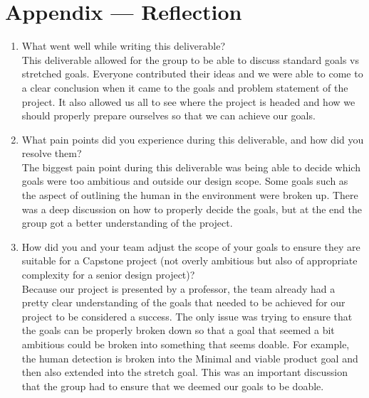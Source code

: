 \documentclass{article}
\begin{document}
\section*{Appendix --- Reflection}
    \begin{enumerate}
        \item What went well while writing this deliverable? \\

This deliverable allowed for the group to be able to discuss standard goals vs stretched goals. Everyone contributed their ideas and we were able to come to a clear conclusion 
when it came to the goals and problem statement of the project. It also allowed us all to see where the project is headed and how we should properly prepare
 ourselves so that we can achieve our goals. 

\item What pain points did you experience during this deliverable, and how
did you resolve them?\\

The biggest pain point during this deliverable was being able to decide which goals were too ambitious and outside our design scope. Some goals such as the aspect of outlining the human 
in the environment were broken up. There was a deep discussion on how to properly decide the goals, but at the end the  group got a better understanding of the project.

\item How did you and your team adjust the scope of your goals to ensure
they are suitable for a Capstone project (not overly ambitious but also of
appropriate complexity for a senior design project)?\\

Because our project is presented by a professor, the team already had a pretty clear understanding of the goals that needed to be achieved for our project to be considered a success.
 The only issue was trying to ensure that the goals can be properly broken down so that a goal that seemed a bit ambitious could be broken into something that seems doable. For example, 
 the human detection is broken into the Minimal and viable product goal and then also extended into the stretch goal. This was an important discussion that the group had to ensure that we 
 deemed our goals to be doable.

    \end{enumerate}
\end{document}

